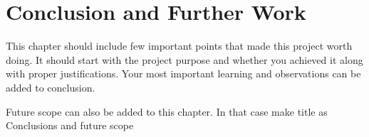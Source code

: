 \chapter{Conclusion and Further Work}

This chapter should include few important points that made this project worth doing. It should start with the project purpose and whether you achieved it along with proper justifications. Your most important learning and observations can be added to conclusion.

Future scope can also be added to this chapter. In that case make title as Conclusions and future scope
